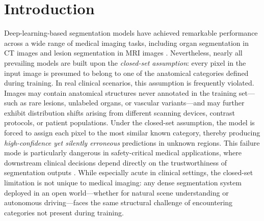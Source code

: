 \documentclass[3p,twocolumn,authoryear]{elsarticle}
\begin{document}

\section{Introduction}
\label{sec:intro}


Deep-learning-based segmentation models have achieved remarkable performance across
a wide range of medical imaging tasks, including organ segmentation in CT images
and lesion segmentation in MRI images
\cite{zhao2023efficientmulti,zeineldin2022multimodalcnn}.
Nevertheless, nearly all prevailing models are built upon the \emph{closed-set assumption}:
every pixel in the input image is presumed to belong to one of the anatomical categories
defined during training.
In real clinical scenarios, this assumption is frequently violated.
Images may contain anatomical structures never annotated in the training set---such as
rare lesions, unlabeled organs, or vascular variants---and may further exhibit
distribution shifts arising from different scanning devices, contrast protocols, or
patient populations.
Under the closed-set assumption, the model is forced to assign each pixel to the most
similar known category, thereby producing \emph{high-confidence yet silently erroneous}
predictions in unknown regions.
This failure mode is particularly dangerous in safety-critical medical applications,
where downstream clinical decisions depend directly on the trustworthiness of
segmentation outputs
\cite{kompa2021secondopinion,li2025evaluationuncertainty,miranda2024exploringtransformer}.
While especially acute in clinical settings, the closed-set limitation is not unique
to medical imaging: any dense segmentation system deployed in an open world---whether
for natural scene understanding or autonomous driving---faces the same structural
challenge of encountering categories not present during training.

\end{document}
